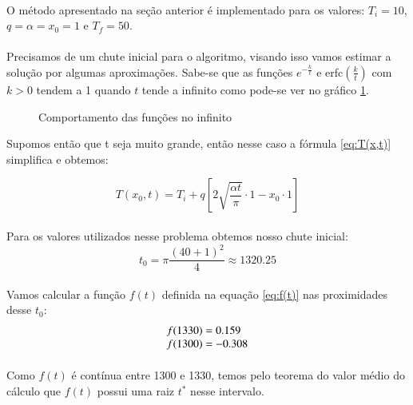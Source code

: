 \documentclass[a4paper,11pt]{article}
\begin{document}
\paragraph{}O método apresentado na seção anterior é implementado para os valores: $T_i = 10$,	 $q = \alpha = x_0 = 1$ e $T_f = 50$.
\paragraph{}Precisamos de um chute inicial para o algoritmo, visando isso vamos estimar a solução por algumas aproximações. Sabe-se que as funções $e^{-\frac{k}{t}}$ e erfc$(\frac{k}{t})$ com $k > 0$ tendem a 1 quando $t$ tende a infinito como pode-se ver no gráfico \ref{graph:exp-erfc}.
\FloatBarrier
\begin{figure}[!htp]
\centering
	
	\caption{Comportamento das funções no infinito}
	\label{graph:exp-erfc}
\end{figure}  
\FloatBarrier
 Supomos então que t seja muito grande, então nesse caso a fórmula \ref{eq:T(x,t)} simplifica e obtemos:

\begin{displaymath}
		T(x_0,t) = T_i + q \left[ 2\sqrt{\frac{\alpha t}{\pi}} \cdot 1 - x_0 \cdot  1 \right] 
\end{displaymath}
\paragraph{}Para os valores utilizados nesse problema obtemos nosso chute inicial:
\begin{displaymath}
	t_0 = \pi \frac{(40 + 1)^2}{4} \approx 1320.25
\end{displaymath}

\paragraph{} Vamos calcular a função $f(t)$ definida na equação \ref{eq:f(t)} nas proximidades desse $t_0$:
		\begin{displaymath}
		\begin{tabular}{l}
		$f(1330) = 0.159$ \\
		$f(1300) = -0.308$ 
		\end{tabular}
		\end{displaymath}
\paragraph{}Como $f(t)$ é contínua entre 1300 e 1330, temos pelo teorema do valor médio do cálculo que $f(t)$ possui uma raiz $t^*$ nesse intervalo. 
\end{document}
